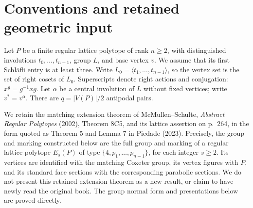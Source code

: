 
\begin{abstract}

A centrally symmetric regular polytope determines a product of dihedral groups indexed by its antipodal vertex pairs. We give a complete presentation of the resulting semidirect product using one relation for each orbit of unordered vertex pairs. An explicit index-two rewriting gives complete presentations for all its endpoint halvings. The bipartite halving argument is proved here, including residual connectivity, flag transitivity and the full type-preserving group. A final observation detects an infinite group whenever a pair orbit is omitted from the presentation. The extension construction, halving operation and Schreier method are classical. The purpose here is to put their exact interfaces in one place, including the converse needed to audit claimed defining presentations.

\end{abstract}

\section{Conventions and retained geometric input}\label{conventions-and-retained-geometric-input}

Let \(P\) be a finite regular lattice polytope of rank \(n\ge2\), with distinguished involutions \(t_0,\ldots,t_{n-1}\), group \(L\), and base vertex \(v\). We assume that its first Schläfli entry is at least three. Write \(L_0=\langle t_1,\ldots,t_{n-1}\rangle\), so the vertex set is the set of right cosets of \(L_0\). Superscripts denote right actions and conjugation: \(x^g=g^{-1}xg\). Let \(\alpha\) be a central involution of \(L\) without fixed vertices; write \(v^*=v^\alpha\). There are \(q=|V(P)|/2\) antipodal pairs.

We retain the matching extension theorem of McMullen--Schulte, \emph{Abstract Regular Polytopes} (2002), Theorem 8C5, and its lattice assertion on p.~264, in the form quoted as Theorem 5 and Lemma 7 in Piedade (2023). Precisely, the group and marking constructed below are the full group and marking of a regular lattice polytope \(E_s(P)\) of type \(\{4,p_1,\ldots,p_{n-1}\}\), for each integer \(s\ge2\). Its vertices are identified with the matching Coxeter group, its vertex figures with \(P\), and its standard face sections with the corresponding parabolic sections. We do not present this retained extension theorem as a new result, or claim to have newly read the original book. The group normal form and presentations below are proved directly.

